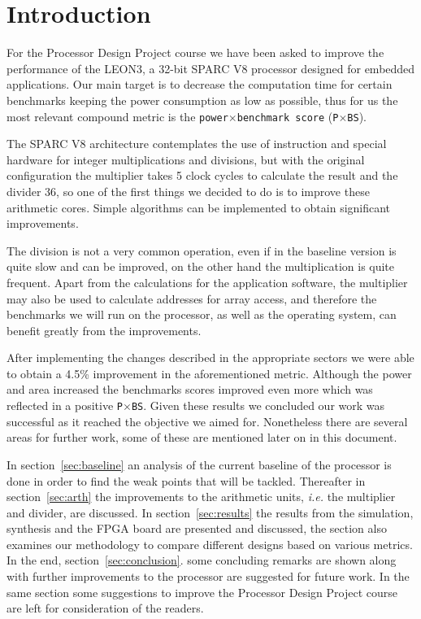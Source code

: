 
\section{Introduction}

For the Processor Design Project course we have been asked to improve the performance of the
LEON3, a 32-bit SPARC V8 processor designed for embedded applications.
Our main target is to decrease the computation time for certain benchmarks keeping the power
consumption as low as possible, thus for us the most relevant compound metric is the
\texttt{power}$\times$\texttt{benchmark score} (\texttt{P}$\times$\texttt{BS}).

The SPARC V8 architecture contemplates the use of instruction and special hardware for integer
multiplications and divisions, but with the original configuration the multiplier takes 5 clock cycles
to calculate the result and the divider 36, so one of the first things we decided to do is to improve
these arithmetic cores. Simple algorithms can be implemented to obtain significant improvements.

The division is not a very common operation, even if in the baseline version is quite slow and can be improved, on the other hand the multiplication is quite frequent. Apart from the calculations for the application software, the multiplier may also be used to calculate addresses for array access, and therefore the benchmarks we will run on the processor, as well as the operating system, can benefit greatly from the improvements.

After implementing the changes described in the appropriate sectors we were able to obtain a 4.5\% improvement in the aforementioned metric. Although the power and area increased the benchmarks scores improved even more which was reflected in a positive \texttt{P$\times$BS}.
Given these results we concluded our work was successful as it reached the objective we aimed for. Nonetheless there are several areas for further work, some of these are mentioned later on in this document.


In section~\ref{sec:baseline} an analysis of the current baseline of the processor is done in order to find the weak points that will be tackled.
Thereafter in section~\ref{sec:arth} the improvements to the arithmetic units, \emph{i.e.} the multiplier and divider, are discussed.
In section~\ref{sec:results} the results from the simulation, synthesis and the FPGA board are presented and discussed, the section also examines our methodology to compare different designs based on various metrics.
In the end, section~\ref{sec:conclusion}. some concluding remarks are shown along with further improvements to the processor are suggested for future work. In the same section some suggestions to improve the Processor Design Project course are left for consideration of the readers.